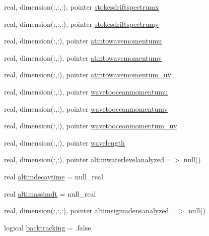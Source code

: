 \begin{DoxyCompactItemize}
real, dimension(\+:,\+:,\+:), pointer \mbox{\hyperlink{structmodulehydrodynamic_1_1t__external_a9290c23daa0306c3df0f1a7702f4134d}{stokesdriftspectrumx}}
\item 
real, dimension(\+:,\+:,\+:), pointer \mbox{\hyperlink{structmodulehydrodynamic_1_1t__external_a7414b071ff31a966b4dbb61f04a686df}{stokesdriftspectrumy}}
\item 
real, dimension(\+:,\+:), pointer \mbox{\hyperlink{structmodulehydrodynamic_1_1t__external_adf39c83e3da6916216f0fd51c5dd6081}{atmtowavemomentumu}}
\item 
real, dimension(\+:,\+:), pointer \mbox{\hyperlink{structmodulehydrodynamic_1_1t__external_a9666e89f68572a2f2cb9ef85b528ca6e}{atmtowavemomentumv}}
\item 
real, dimension(\+:,\+:), pointer \mbox{\hyperlink{structmodulehydrodynamic_1_1t__external_ad12e037f3bc0187867f3832d27b90f30}{atmtowavemomentum\+\_\+uv}}
\item 
real, dimension(\+:,\+:), pointer \mbox{\hyperlink{structmodulehydrodynamic_1_1t__external_a04b2a689a830aef551549b1e043b5cae}{wavetooceanmomentumu}}
\item 
real, dimension(\+:,\+:), pointer \mbox{\hyperlink{structmodulehydrodynamic_1_1t__external_a3476a34a5ba7c2b16d0d16049d5546a5}{wavetooceanmomentumv}}
\item 
real, dimension(\+:,\+:), pointer \mbox{\hyperlink{structmodulehydrodynamic_1_1t__external_a91babb92ab7261061a8527172970a0c5}{wavetooceanmomentum\+\_\+uv}}
\item 
real, dimension(\+:,\+:), pointer \mbox{\hyperlink{structmodulehydrodynamic_1_1t__external_ade962fc9b2c55be9f0101809b0902f10}{wavelength}}
\item 
real, dimension(\+:,\+:), pointer \mbox{\hyperlink{structmodulehydrodynamic_1_1t__external_a7f50200ee2bf4bd1e09af2e0c6f81f80}{altimwaterlevelanalyzed}} =$>$ null()
\item 
real \mbox{\hyperlink{structmodulehydrodynamic_1_1t__external_a0bb60614b7dc74a342edf9f34fe717ab}{altimdecaytime}} = null\+\_\+real
\item 
real \mbox{\hyperlink{structmodulehydrodynamic_1_1t__external_ae50beb87e9a3f772458807bfeb42d53e}{altimassimdt}} = null\+\_\+real
\item 
real, dimension(\+:,\+:,\+:), pointer \mbox{\hyperlink{structmodulehydrodynamic_1_1t__external_a111904916c3520e29e459cba7be519ec}{altimsigmadensanalyzed}} =$>$ null()
\item 
logical \mbox{\hyperlink{structmodulehydrodynamic_1_1t__external_a7f9d53d36458c1cc669e42a9dc93ee40}{backtracking}} = .false.
\end{DoxyCompactItemize}


